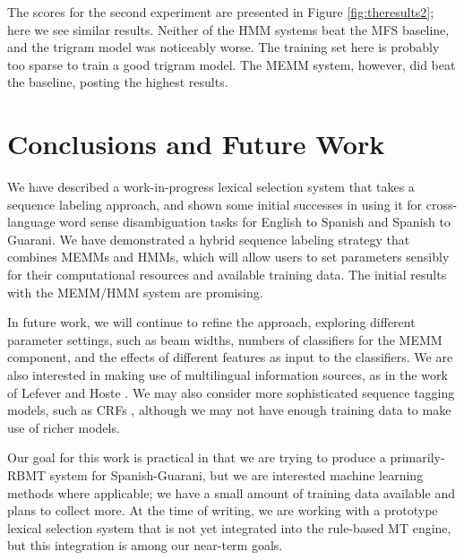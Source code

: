 \documentclass[11pt]{article}
\begin{document}
The scores for the second experiment are presented in Figure
\ref{fig:theresults2}; here we see similar results. Neither of the HMM systems
beat the MFS baseline, and the trigram model was noticeably worse. The training
set here is probably too sparse to train a good trigram model. The MEMM system,
however, did beat the baseline, posting the highest results.



\section{Conclusions and Future Work}
We have described a work-in-progress lexical selection system that takes a
sequence labeling approach, and shown some initial successes in using it for
cross-language word sense disambiguation tasks for English to Spanish and
Spanish to Guarani.  We have demonstrated a hybrid sequence labeling strategy
that combines MEMMs and HMMs, which will allow users to set parameters sensibly
for their computational resources and available training data. The initial
results with the MEMM/HMM system are promising.

In future work, we will continue to refine the approach, exploring different
parameter settings, such as beam widths, numbers of classifiers for the MEMM
component, and the effects of different features as input to the classifiers.
We are also interested in making use of multilingual information sources,
as in the work of Lefever and Hoste
. We may also consider more
sophisticated sequence tagging models, such as CRFs
\cite{DBLP:conf/icml/LaffertyMP01}, although we may not have enough training
data to make use of richer models.

Our goal for this work is practical in that we are trying to produce a
primarily-RBMT system for Spanish-Guarani, but we are interested machine
learning methods where applicable; we have a small amount of training data
available and plans to collect more.  At the time of writing, we are working
with a prototype lexical selection system that is not yet integrated into the
rule-based MT engine, but this integration is among our near-term goals.
\end{document}
